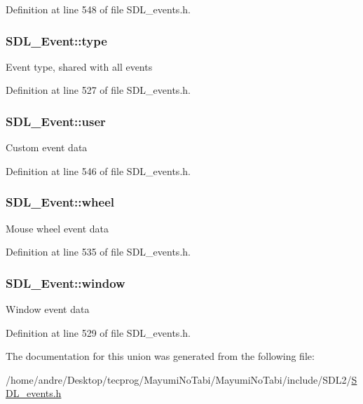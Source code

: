 Definition at line 548 of file S\-D\-L\-\_\-events.\-h.

\hypertarget{union_s_d_l___event_a237648bec242d2d5835f1a4250ddfa46}{
\subsubsection[{type}]{ S\-D\-L\-\_\-\-Event\-::type}}\label{union_s_d_l___event_a237648bec242d2d5835f1a4250ddfa46}
Event type, shared with all events 

Definition at line 527 of file S\-D\-L\-\_\-events.\-h.

\hypertarget{union_s_d_l___event_ab7c394e3ce7bf1e4f8d68bc0e9f1b042}{
\subsubsection[{user}]{ S\-D\-L\-\_\-\-Event\-::user}}\label{union_s_d_l___event_ab7c394e3ce7bf1e4f8d68bc0e9f1b042}
Custom event data 

Definition at line 546 of file S\-D\-L\-\_\-events.\-h.

\hypertarget{union_s_d_l___event_a267d3f550715519ec90a81ccd0e6cbda}{
\subsubsection[{wheel}]{ S\-D\-L\-\_\-\-Event\-::wheel}}\label{union_s_d_l___event_a267d3f550715519ec90a81ccd0e6cbda}
Mouse wheel event data 

Definition at line 535 of file S\-D\-L\-\_\-events.\-h.

\hypertarget{union_s_d_l___event_a826936b3275406d857bc6654669fae71}{
\subsubsection[{window}]{ S\-D\-L\-\_\-\-Event\-::window}}\label{union_s_d_l___event_a826936b3275406d857bc6654669fae71}
Window event data 

Definition at line 529 of file S\-D\-L\-\_\-events.\-h.



The documentation for this union was generated from the following file\-:\begin{DoxyCompactItemize}
\item 
/home/andre/\-Desktop/tecprog/\-Mayumi\-No\-Tabi/\-Mayumi\-No\-Tabi/include/\-S\-D\-L2/\hyperlink{_s_d_l__events_8h}{S\-D\-L\-\_\-events.\-h}\end{DoxyCompactItemize}
